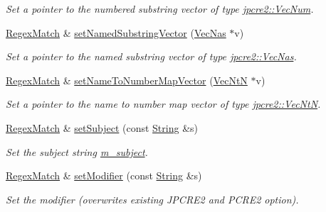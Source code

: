 \begin{DoxyCompactItemize}
\begin{DoxyCompactList}\small\item\em Set a pointer to the numbered substring vector of type \hyperlink{namespacejpcre2_ac1cf752c8fbb0be78020be3b80e77ce3}{jpcre2\+::\+Vec\+Num}. \end{DoxyCompactList}\item 
\hyperlink{classjpcre2_1_1RegexMatch}{Regex\+Match} \& \hyperlink{classjpcre2_1_1RegexMatch_ae495431f57cae54363331237ab21b56c_ae495431f57cae54363331237ab21b56c}{set\+Named\+Substring\+Vector} (\hyperlink{namespacejpcre2_a2b121ae776ea5b2913839f418a7d856b}{Vec\+Nas} $\ast$v)
\begin{DoxyCompactList}\small\item\em Set a pointer to the named substring vector of type \hyperlink{namespacejpcre2_a2b121ae776ea5b2913839f418a7d856b}{jpcre2\+::\+Vec\+Nas}. \end{DoxyCompactList}\item 
\hyperlink{classjpcre2_1_1RegexMatch}{Regex\+Match} \& \hyperlink{classjpcre2_1_1RegexMatch_a04926e61d8b5f1d8bdf344efecd567d8_a04926e61d8b5f1d8bdf344efecd567d8}{set\+Name\+To\+Number\+Map\+Vector} (\hyperlink{namespacejpcre2_a88a7aaf84cad627d34c8152e726168eb}{Vec\+NtN} $\ast$v)
\begin{DoxyCompactList}\small\item\em Set a pointer to the name to number map vector of type \hyperlink{namespacejpcre2_a88a7aaf84cad627d34c8152e726168eb}{jpcre2\+::\+Vec\+NtN}. \end{DoxyCompactList}\item 
\hyperlink{classjpcre2_1_1RegexMatch}{Regex\+Match} \& \hyperlink{classjpcre2_1_1RegexMatch_a635c652195deaa8ebb9e107c4f972aab_a635c652195deaa8ebb9e107c4f972aab}{set\+Subject} (const \hyperlink{namespacejpcre2_a91f03070152fb228bc116c5a737f1d16}{String} \&s)
\begin{DoxyCompactList}\small\item\em Set the subject string \hyperlink{classjpcre2_1_1RegexMatch_a9df4f1897e7fa33e05a9f6f938992ca7}{m\+\_\+subject}. \end{DoxyCompactList}\item 
\hyperlink{classjpcre2_1_1RegexMatch}{Regex\+Match} \& \hyperlink{classjpcre2_1_1RegexMatch_a9df7e92f96b61553f62720cb8f5f23e5_a9df7e92f96b61553f62720cb8f5f23e5}{set\+Modifier} (const \hyperlink{namespacejpcre2_a91f03070152fb228bc116c5a737f1d16}{String} \&s)
\begin{DoxyCompactList}\small\item\em Set the modifier (overwrites existing J\+P\+C\+R\+E2 and P\+C\+R\+E2 option). \end{DoxyCompactList}\item 

\end{DoxyCompactItemize}

